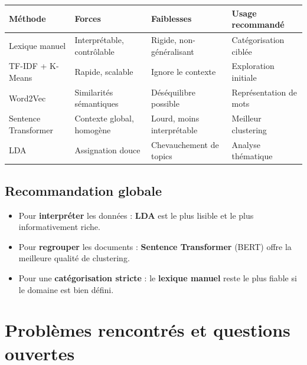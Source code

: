 \documentclass[12pt,a4paper]{article}
\begin{document}
\begin{center}
\renewcommand{\arraystretch}{1.3}
\small
\setlength{\tabcolsep}{4pt}
\begin{tabularx}{\textwidth}{@{}>{\raggedright\arraybackslash}p{2.6cm}>{\raggedright\arraybackslash}X>{\raggedright\arraybackslash}X>{\raggedright\arraybackslash}X@{}}
\toprule
\textbf{Méthode} & \textbf{Forces} & \textbf{Faiblesses} & \textbf{Usage recommandé} \\
\midrule
Lexique manuel
  & Interprétable, contrôlable
  & Rigide, non-généralisant
  & Catégorisation ciblée \\
\midrule
TF-IDF + K-Means
  & Rapide, scalable
  & Ignore le contexte
  & Exploration initiale \\
\midrule
Word2Vec
  & Similarités sémantiques
  & Déséquilibre possible
  & Représentation de mots \\
\midrule
Sentence Transformer
  & Contexte global, homogène
  & Lourd, moins interprétable
  & Meilleur clustering \\
\midrule
LDA
  & Assignation douce
  & Chevauchement de topics
  & Analyse thématique \\
\bottomrule
\end{tabularx}
\end{center}

\subsection*{Recommandation globale}

\begin{itemize}
  \item Pour \textbf{interpréter} les données : \textbf{LDA} est le plus lisible et le plus informativement riche.
  \item Pour \textbf{regrouper} les documents : \textbf{Sentence Transformer} (BERT) offre la meilleure qualité de clustering.
  \item Pour une \textbf{catégorisation stricte} : le \textbf{lexique manuel} reste le plus fiable si le domaine est bien défini.
\end{itemize}

\section{Problèmes rencontrés et questions ouvertes}
\end{document}
